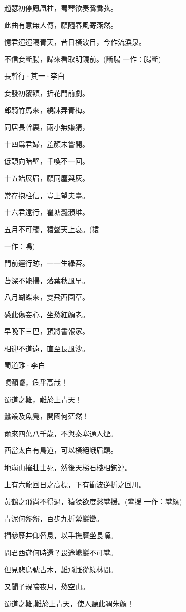 \documentclass[12pt,a4paper]{ctexbook}
\begin{document}
趙瑟初停鳳凰柱，蜀琴欲奏鴛鴦弦。\par
此曲有意無人傳，願隨春風寄燕然。\par
憶君迢迢隔青天，昔日橫波目，今作流淚泉。\par
不信妾斷腸，歸來看取明鏡前。(斷腸 一作：腸斷)\par
長幹行·其一·李白\par
妾發初覆額，折花門前劇。\par
郎騎竹馬來，繞牀弄青梅。\par
同居長幹裏，兩小無嫌猜，\par
十四爲君婦，羞顏未嘗開。\par
低頭向暗壁，千喚不一回。\par
十五始展眉，願同塵與灰。\par
常存抱柱信，豈上望夫臺。\par
十六君遠行，瞿塘灩澦堆。\par
五月不可觸，猿聲天上哀。(猿\par
一作：鳴)\par
門前遲行跡，一一生綠苔。\par
苔深不能掃，落葉秋風早。\par
八月蝴蝶來，雙飛西園草。\par
感此傷妾心，坐愁紅顏老。\par
早晚下三巴，預將書報家。\par
相迎不道遠，直至長風沙。\par
蜀道難·李白\par
噫籲嚱，危乎高哉！\par
蜀道之難，難於上青天！\par
蠶叢及魚鳧，開國何茫然！\par
爾來四萬八千歲，不與秦塞通人煙。\par
西當太白有鳥道，可以橫絕峨眉巔。\par
地崩山摧壯士死，然後天梯石棧相鉤連。\par
上有六龍回日之高標，下有衝波逆折之回川。\par
黃鶴之飛尚不得過，猿猱欲度愁攀援。(攀援 一作：攀緣)\par
青泥何盤盤，百步九折縈巖巒。\par
捫參歷井仰脅息，以手撫膺坐長嘆。\par
問君西遊何時還？畏途巉巖不可攀。\par
但見悲鳥號古木，雄飛雌從繞林間。\par
又聞子規啼夜月，愁空山。\par
蜀道之難,難於上青天，使人聽此凋朱顏！\par
\end{document}

